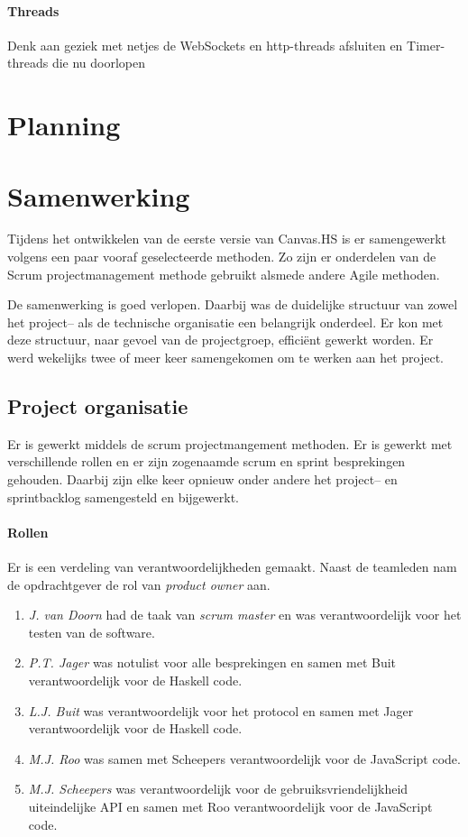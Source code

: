 \paragraph{Threads}
Denk aan geziek met netjes de WebSockets en http-threads afsluiten en Timer-threads die nu doorlopen

\section{Planning}
\section{Samenwerking}
Tijdens het ontwikkelen van de eerste versie van Canvas.HS is er samengewerkt volgens een paar vooraf geselecteerde methoden. Zo zijn er onderdelen van de Scrum projectmanagement methode gebruikt alsmede andere Agile methoden.

De samenwerking is goed verlopen. Daarbij was de duidelijke structuur van zowel het project– als de technische organisatie een belangrijk onderdeel. Er kon met deze structuur, naar gevoel van de projectgroep, efficiënt gewerkt worden. Er werd wekelijks twee of meer keer samengekomen om te werken aan het project.

\subsection{Project organisatie}
Er is gewerkt middels de scrum projectmangement methoden. Er is gewerkt met verschillende rollen en er zijn zogenaamde scrum en sprint besprekingen gehouden. Daarbij zijn elke keer opnieuw onder andere het project– en sprintbacklog samengesteld en bijgewerkt.

\paragraph{Rollen} Er is een verdeling van verantwoordelijkheden gemaakt. Naast de teamleden nam de opdrachtgever de rol van \emph{product owner} aan.
\begin{enumerate}
    \item \emph{J. van Doorn} had de taak van \emph{scrum master} en was verantwoordelijk voor het testen van de software.
    \item \emph{P.T. Jager} was notulist voor alle besprekingen en samen met Buit verantwoordelijk voor de Haskell code.
    \item \emph{L.J. Buit} was verantwoordelijk voor het protocol en samen met Jager verantwoordelijk voor de Haskell code.
    \item \emph{M.J. Roo} was samen met Scheepers verantwoordelijk voor de JavaScript code.
    \item \emph{M.J. Scheepers} was verantwoordelijk voor de gebruiksvriendelijkheid uiteindelijke API en samen met Roo verantwoordelijk voor de JavaScript code.
\end{enumerate}

